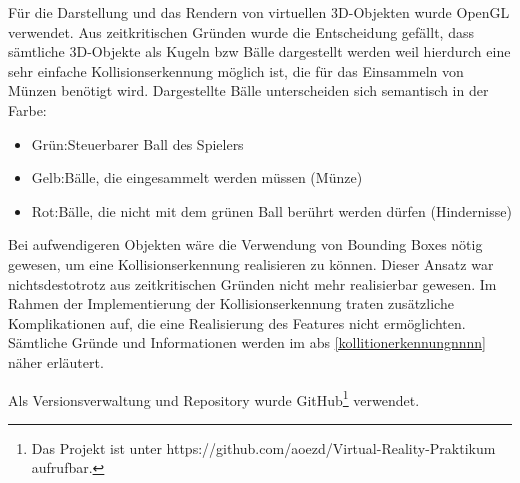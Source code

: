 Für die Darstellung und das Rendern von virtuellen 3D-Objekten wurde OpenGL verwendet. Aus zeitkritischen Gründen wurde die Entscheidung gefällt, dass sämtliche 3D-Objekte als Kugeln \acs{bzw} Bälle dargestellt werden weil hierdurch eine sehr einfache Kollisionserkennung möglich ist, die für das Einsammeln von Münzen benötigt wird. Dargestellte Bälle unterscheiden sich semantisch in der Farbe:

\begin{itemize}[label=]
    \item Grün:\hspace{0.8cm}Steuerbarer Ball des Spielers
    \item Gelb:\hspace{0.85cm}Bälle, die eingesammelt werden müssen (Münze)
    \item Rot:\hspace{1.0cm}Bälle, die nicht mit dem grünen Ball berührt werden dürfen (Hindernisse)
\end{itemize}

\noindent Bei aufwendigeren Objekten wäre die Verwendung von Bounding Boxes nötig gewesen, um eine Kollisionserkennung realisieren zu können. Dieser Ansatz war nichtsdestotrotz aus zeitkritischen Gründen nicht mehr realisierbar gewesen. Im Rahmen der Implementierung der Kollisionserkennung traten zusätzliche Komplikationen auf, die eine Realisierung des Features nicht ermöglichten. Sämtliche Gründe und Informationen werden im \acs{abs} \ref{kollitionerkennungnnnn} näher erläutert.

Als Versionsverwaltung und Repository wurde GitHub\footnote{Das Projekt ist unter https://github.com/aoezd/Virtual-Reality-Praktikum aufrufbar.} verwendet.


\newpage